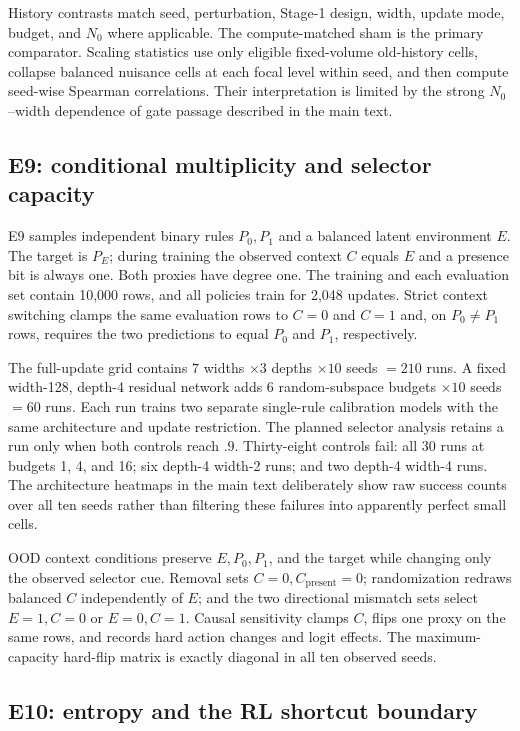 \documentclass[11pt,a4paper]{article}
\begin{document}
History contrasts match seed, perturbation, Stage-1 design, width, update mode, budget, and $N_0$ where applicable. The compute-matched sham is the primary comparator. Scaling statistics use only eligible fixed-volume old-history cells, collapse balanced nuisance cells at each focal level within seed, and then compute seed-wise Spearman correlations. Their interpretation is limited by the strong $N_0$--width dependence of gate passage described in the main text.

\subsection{E9: conditional multiplicity and selector capacity}

E9 samples independent binary rules $P_0,P_1$ and a balanced latent environment $E$. The target is $P_E$; during training the observed context $C$ equals $E$ and a presence bit is always one. Both proxies have degree one. The training and each evaluation set contain 10,000 rows, and all policies train for 2,048 updates. Strict context switching clamps the same evaluation rows to $C=0$ and $C=1$ and, on $P_0\ne P_1$ rows, requires the two predictions to equal $P_0$ and $P_1$, respectively.

The full-update grid contains $7$ widths $\times3$ depths $\times10$ seeds $=210$ runs. A fixed width-128, depth-4 residual network adds $6$ random-subspace budgets $\times10$ seeds $=60$ runs. Each run trains two separate single-rule calibration models with the same architecture and update restriction. The planned selector analysis retains a run only when both controls reach .9. Thirty-eight controls fail: all 30 runs at budgets 1, 4, and 16; six depth-4 width-2 runs; and two depth-4 width-4 runs. The architecture heatmaps in the main text deliberately show raw success counts over all ten seeds rather than filtering these failures into apparently perfect small cells.

OOD context conditions preserve $E,P_0,P_1$, and the target while changing only the observed selector cue. Removal sets $C=0,C_{\mathrm{present}}=0$; randomization redraws balanced $C$ independently of $E$; and the two directional mismatch sets select $E=1,C=0$ or $E=0,C=1$. Causal sensitivity clamps $C$, flips one proxy on the same rows, and records hard action changes and logit effects. The maximum-capacity hard-flip matrix is exactly diagonal in all ten observed seeds.

\subsection{E10: entropy and the RL shortcut boundary}
\end{document}
